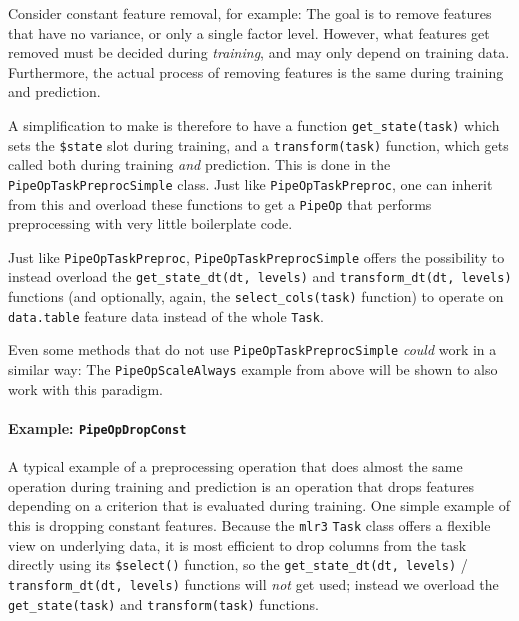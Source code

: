 \documentclass[]{article}
\let\oldparagraph\paragraph
\renewcommand{\paragraph}[1]{\oldparagraph{#1}\mbox{}}
\begin{document}
Consider constant feature removal, for example: The goal is to remove features that have no variance, or only a single factor level.
However, what features get removed must be decided during \emph{training}, and may only depend on training data.
Furthermore, the actual process of removing features is the same during training and prediction.

A simplification to make is therefore to have a function \texttt{get\_state(task)} which sets the \texttt{\$state} slot during training, and a \texttt{transform(task)} function, which gets called both during training \emph{and} prediction.
This is done in the \texttt{PipeOpTaskPreprocSimple} class.
Just like \texttt{PipeOpTaskPreproc}, one can inherit from this and overload these functions to get a \texttt{PipeOp} that performs preprocessing with very little boilerplate code.

Just like \texttt{PipeOpTaskPreproc}, \texttt{PipeOpTaskPreprocSimple} offers the possibility to instead overload the \texttt{get\_state\_dt(dt,\ levels)} and \texttt{transform\_dt(dt,\ levels)} functions (and optionally, again, the \texttt{select\_cols(task)} function) to operate on \texttt{data.table} feature data instead of the whole \texttt{Task}.

Even some methods that do not use \texttt{PipeOpTaskPreprocSimple} \emph{could} work in a similar way: The \texttt{PipeOpScaleAlways} example from above will be shown to also work with this paradigm.

\hypertarget{example-pipeopdropconst}{%
\paragraph{\texorpdfstring{Example: \texttt{PipeOpDropConst}}{Example: PipeOpDropConst}}\label{example-pipeopdropconst}}

A typical example of a preprocessing operation that does almost the same operation during training and prediction is an operation that drops features depending on a criterion that is evaluated during training.
One simple example of this is dropping constant features.
Because the \texttt{mlr3} \texttt{Task} class offers a flexible view on underlying data, it is most efficient to drop columns from the task directly using its \texttt{\$select()} function, so the \texttt{get\_state\_dt(dt,\ levels)} / \texttt{transform\_dt(dt,\ levels)} functions will \emph{not} get used; instead we overload the \texttt{get\_state(task)} and \texttt{transform(task)} functions.
\end{document}
